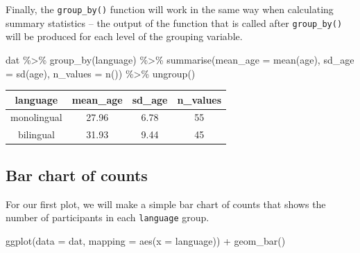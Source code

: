 \documentclass[
  english,
  doc,floatsintext]{apa6}
\newenvironment{Shaded}{\begin{snugshade}}{\end{snugshade}}
\newcommand{\AttributeTok}[1]{\textcolor[rgb]{0.77,0.63,0.00}{#1}}
\newcommand{\FunctionTok}[1]{\textcolor[rgb]{0.00,0.00,0.00}{#1}}
\newcommand{\NormalTok}[1]{#1}
\newcommand{\SpecialCharTok}[1]{\textcolor[rgb]{0.00,0.00,0.00}{#1}}
\begin{document}
Finally, the \texttt{group\_by()} function will work in the same way when calculating summary statistics -- the output of the function that is called after \texttt{group\_by()} will be produced for each level of the grouping variable.

\begin{Shaded}
\begin{Highlighting}[]
\NormalTok{dat }\SpecialCharTok{\%\textgreater{}\%}
  \FunctionTok{group\_by}\NormalTok{(language) }\SpecialCharTok{\%\textgreater{}\%}
  \FunctionTok{summarise}\NormalTok{(}\AttributeTok{mean\_age =} \FunctionTok{mean}\NormalTok{(age),}
            \AttributeTok{sd\_age =} \FunctionTok{sd}\NormalTok{(age),}
            \AttributeTok{n\_values =} \FunctionTok{n}\NormalTok{()) }\SpecialCharTok{\%\textgreater{}\%}
  \FunctionTok{ungroup}\NormalTok{()}
\end{Highlighting}
\end{Shaded}

\begin{tabular}{c|c|c|c}
\hline
language & mean\_age & sd\_age & n\_values\\
\hline
monolingual & 27.96 & 6.78 & 55\\
\hline
bilingual & 31.93 & 9.44 & 45\\
\hline
\end{tabular}

\hypertarget{bar-chart-of-counts}{%
\subsection{Bar chart of counts}\label{bar-chart-of-counts}}

For our first plot, we will make a simple bar chart of counts that shows the number of participants in each \texttt{language} group.

\begin{Shaded}
\begin{Highlighting}[]
\FunctionTok{ggplot}\NormalTok{(}\AttributeTok{data =}\NormalTok{ dat, }\AttributeTok{mapping =} \FunctionTok{aes}\NormalTok{(}\AttributeTok{x =}\NormalTok{ language)) }\SpecialCharTok{+}
  \FunctionTok{geom\_bar}\NormalTok{()}
\end{Highlighting}
\end{Shaded}
\end{document}
